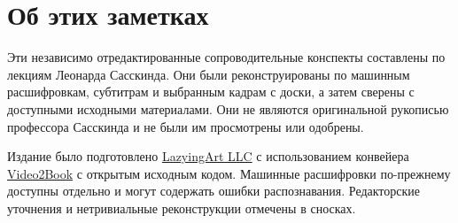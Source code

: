 \documentclass[11pt,oneside]{book}
\begin{document}
\frontmatter
\hypersetup{pageanchor=false}

\hypersetup{pageanchor=true}

\clearpage
\chapter*{Об этих заметках}
Эти независимо отредактированные сопроводительные конспекты составлены по лекциям Леонарда Сасскинда. Они были реконструированы по машинным расшифровкам, субтитрам и выбранным кадрам с доски, а затем сверены с доступными исходными материалами. Они не являются оригинальной рукописью профессора Сасскинда и не были им просмотрены или одобрены.

Издание было подготовлено \href{https://lazying.art}{LazyingArt LLC} с использованием конвейера \href{https://github.com/lachlanchen/Video2Book}{Video2Book} с открытым исходным кодом. Машинные расшифровки по-прежнему доступны отдельно и могут содержать ошибки распознавания. Редакторские уточнения и нетривиальные реконструкции отмечены в сносках.
\clearpage
\tableofcontents
\mainmatter










\end{document}
